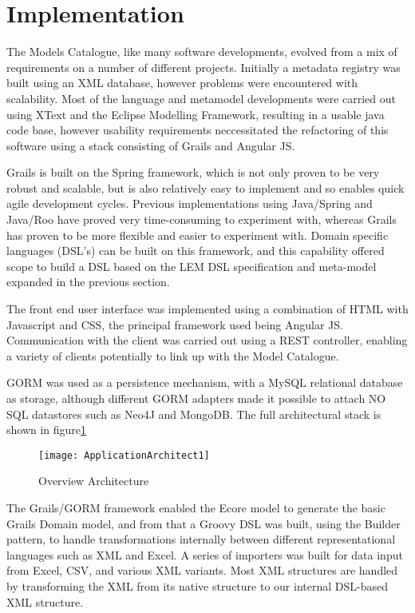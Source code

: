 \section{Implementation}

The Models Catalogue, like many software developments, evolved from a mix of requirements on a number of different projects.  Initially a metadata registry was built using an XML database, however problems were encountered with scalability.  Most of the language and metamodel developments were carried out using XText and the Eclipse Modelling Framework, resulting in a usable java code base, however usability requirements neccessitated the refactoring of this software using a stack consisting of Grails and Angular JS. 

Grails is built on the Spring framework, which is not only proven to be very robust and scalable, but is also relatively easy to implement and so enables quick agile development cycles. Previous implementations using Java/Spring and Java/Roo have proved very time-consuming to experiment with, whereas Grails has proven to be more flexible and easier to experiment with.  Domain specific languages (DSL’s) can be  built on this framework, and this capability offered scope to build a DSL based on the LEM DSL specification and meta-model expanded in the previous section.
 
The front end user interface was implemented using a combination of HTML with Javascript and CSS, the principal framework used being Angular JS. Communication with the client was carried out using a REST controller, enabling a variety of clients potentially to link up with the Model Catalogue.

GORM was used as a persistence mechanism, with a MySQL relational database as storage, although different GORM adapters made it possible to attach NO SQL datastores such as Neo4J and MongoDB. The full architectural stack is shown in figure\ref{fig:ApplicationArchitectMDR}

\begin{figure}[here]
	\texttt{[image: ApplicationArchitect1]}
	\caption{Overview Architecture} 
	\label{fig:ApplicationArchitectMDR}
\end{figure}

The Grails/GORM framework enabled the Ecore model to generate the basic Grails Domain model, and from that a Groovy DSL was built, using the Builder pattern, to handle transformations internally between different representational languages such as XML and Excel. A series of importers was built for data input from Excel, CSV, and various XML variants. Most XML structures are handled by transforming the XML from its native structure to our internal DSL-based XML structure. 

